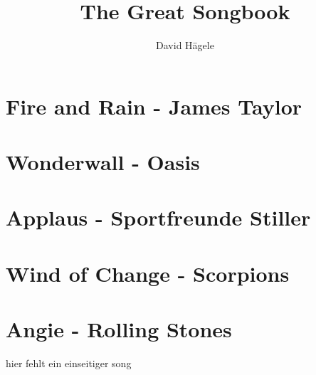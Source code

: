 \documentclass[a5paper,onepage,titlepage]{article}
\title{The Great Songbook}
\author{David H\"agele}
\newcommand{\addemptypage}{\newpage\thispagestyle{empty}\mbox{}\newpage}
\begin{document}
\maketitle
\addemptypage
\addemptypage
\tableofcontents
\addemptypage

\section{Fire and Rain - James Taylor}

\newpage

\newpage

\section{Wonderwall - Oasis}

\newpage

\newpage

\section{Applaus - Sportfreunde Stiller}

\newpage

\newpage

\section{Wind of Change - Scorpions}

\newpage

\newpage

\section{Angie - Rolling Stones}

\newpage

hier fehlt ein einseitiger song
\newpage
\end{document}
